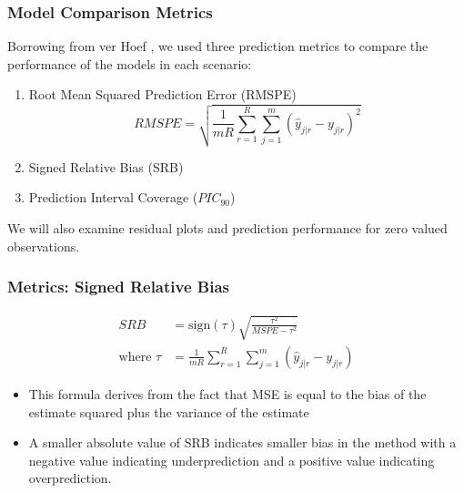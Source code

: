 \documentclass{beamer}
\begin{document}
\begin{frame}
	\frametitle{Model Comparison Metrics}
	Borrowing from ver Hoef \cite{verhoef13}, we used three prediction metrics to compare the performance of the models in each scenario:
	\begin{enumerate}
		\item Root Mean Squared Prediction Error (RMSPE)
		$$
		RMSPE = \sqrt{\frac{1}{mR} \sum_{r=1}^R \sum_{j=1}^m (\hat{y}_{j|r} - y_{j|r})^2}
		$$
		\item Signed Relative Bias (SRB)
		\item Prediction Interval Coverage ($PIC_{90}$)
	\end{enumerate}
	We will also examine residual plots and prediction performance for zero valued observations.
\end{frame}


\begin{frame}
	\frametitle{Metrics: Signed Relative Bias}
	\begin{align*}
		SRB &= \text{sign}(\tau) \sqrt{\frac{\tau^2}{MSPE - \tau^2}} \\
		\text{where }\tau &= \frac{1}{mR} \sum_{r = 1}^R \sum_{j = 1}^m (\hat{y}_{j|r} - y_{j|r})
	\end{align*}
	\begin{itemize}
		\item This formula derives from the fact that MSE is equal to the bias of the estimate squared plus the variance of the estimate
		\item A smaller absolute value of SRB indicates smaller bias in the method with a negative value indicating underprediction and a positive value indicating overprediction.\cite{verhoef13}
	\end{itemize}
\end{frame}
\end{document}
